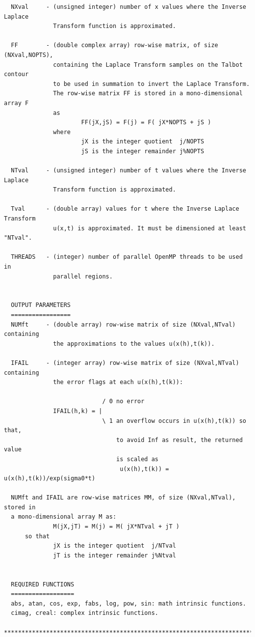 \documentclass[a4paper,10pt]{report}%
\begin{document}
\begin{lstlisting}
  NXval     - (unsigned integer) number of x values where the Inverse Laplace
              Transform function is approximated.

  FF        - (double complex array) row-wise matrix, of size (NXval,NOPTS),
              containing the Laplace Transform samples on the Talbot contour
              to be used in summation to invert the Laplace Transform.
              The row-wise matrix FF is stored in a mono-dimensional array F
              as
                      FF(jX,jS) = F(j) = F( jX*NOPTS + jS )
              where
                      jX is the integer quotient  j/NOPTS
                      jS is the integer remainder j%NOPTS

  NTval     - (unsigned integer) number of t values where the Inverse Laplace
              Transform function is approximated.

  Tval      - (double array) values for t where the Inverse Laplace Transform
              u(x,t) is approximated. It must be dimensioned at least "NTval".

  THREADS   - (integer) number of parallel OpenMP threads to be used in
              parallel regions.


  OUTPUT PARAMETERS
  =================
  NUMft     - (double array) row-wise matrix of size (NXval,NTval) containing
              the approximations to the values u(x(h),t(k)).

  IFAIL     - (integer array) row-wise matrix of size (NXval,NTval) containing
              the error flags at each u(x(h),t(k)):

                            / 0 no error
              IFAIL(h,k) = |
                            \ 1 an overflow occurs in u(x(h),t(k)) so that,
                                to avoid Inf as result, the returned value
                                is scaled as
                                 u(x(h),t(k)) = u(x(h),t(k))/exp(sigma0*t)

  NUMft and IFAIL are row-wise matrices MM, of size (NXval,NTval), stored in
  a mono-dimensional array M as:
              M(jX,jT) = M(j) = M( jX*NTval + jT )
      so that
              jX is the integer quotient  j/NTval
              jT is the integer remainder j%Ntval


  REQUIRED FUNCTIONS
  ==================
  abs, atan, cos, exp, fabs, log, pow, sin: math intrinsic functions.
  cimag, creal: complex intrinsic functions.

*****************************************************************************\
\end{lstlisting}
\end{document}
